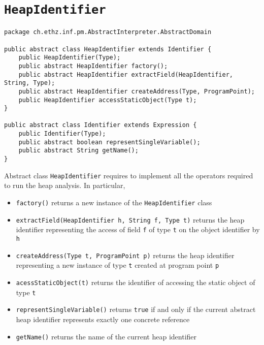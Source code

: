 \documentclass[11pt]{article}
\newcommand{\statement}[1]{\lstinline{#1}}
\begin{document}
\section{\statement{HeapIdentifier}}
\begin{lstlisting}
package ch.ethz.inf.pm.AbstractInterpreter.AbstractDomain

public abstract class HeapIdentifier extends Identifier {
    public HeapIdentifier(Type);
    public abstract HeapIdentifier factory();
    public abstract HeapIdentifier extractField(HeapIdentifier, String, Type);
    public abstract HeapIdentifier createAddress(Type, ProgramPoint);
    public HeapIdentifier accessStaticObject(Type t);
}

public abstract class Identifier extends Expression {
    public Identifier(Type);
    public abstract boolean representSingleVariable();
    public abstract String getName();
}
\end{lstlisting}

Abstract class \statement{HeapIdentifier} requires to implement all the operators required to run the heap analysis. In particular,
\begin{itemize}
\item \statement{factory()} returns a new instance of the \statement{HeapIdentifier} class
\item \statement{extractField(HeapIdentifier h, String f, Type t)} returns the heap identifier representing the access of field \statement{f} of type \statement{t} on the object identifier by \statement{h}
\item \statement{createAddress(Type t, ProgramPoint p)} returns the heap identifier representing a new instance of type \statement{t} created at program point \statement{p}
\item \statement{acessStaticObject(t)} returns the identifier of accessing the static object of type \statement{t}
\item \statement{representSingleVariable()} returns \statement{true} if and only if the current abstract heap identifier represents exactly one concrete reference
\item \statement{getName()} returns the name of the current heap identifier
\end{itemize}
\end{document}
